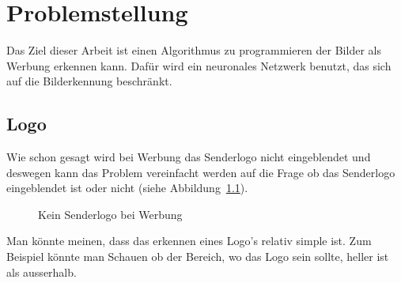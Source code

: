 \documentclass[12pt,a4paper]{report}
\begin{document}
\chapter{Problemstellung}
Das Ziel dieser Arbeit ist einen Algorithmus zu programmieren der Bilder als Werbung erkennen kann.
Dafür wird ein neuronales Netzwerk benutzt, das sich auf die Bilderkennung beschränkt.
\section{Logo}
Wie schon gesagt wird bei Werbung das Senderlogo nicht eingeblendet und deswegen kann das Problem
vereinfacht werden auf die Frage ob das Senderlogo eingeblendet ist oder nicht (siehe Abbildung~\ref{fig:logo1}).
\begin{figure}[h]%
    \centering
    \qquad
    \caption{Kein Senderlogo bei Werbung}%
    \label{fig:logo1}%
\end{figure}
Man könnte meinen, dass das erkennen eines Logo's relativ simple ist.
Zum Beispiel könnte man Schauen ob der Bereich, wo das Logo sein sollte, heller ist als ausserhalb.
\end{document}
